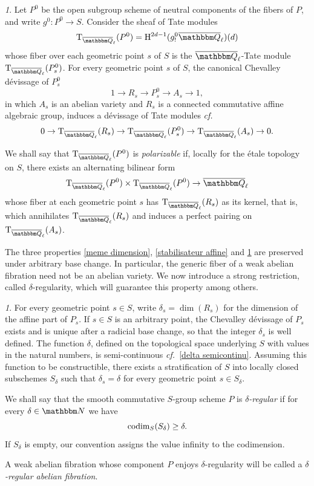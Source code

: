 \documentclass[12pt,english]{smfart}
\numberwithin{equation}{subsection}
\theoremstyle{remark}
\newtheorem{numero}[equation]{}
\newcommand\rmT{{\rm T}}
\newcommand\NN{{\mathbbm N}}
\newcommand\QQ{{\mathbbm Q}}
\newcommand\rmH{{\rm H}}
\newcommand\cf{{\it cf.\ }}
\newcommand\Ql{{\overline\QQ_\ell}}
\begin{document}
\begin{numero}\label{module de Tate polarisable}
Let $P^0$ be the open subgroup scheme of neutral components of the fibers of $P$, and write $g^0:P^0\rightarrow S$. Consider the sheaf of Tate modules
$$\rmT_\Ql(P^0)=\rmH^{2d-1}(g^0_! \Ql)(d)$$
whose fiber over each geometric point $s$ of $S$ is the $\Ql$-Tate module $\rmT_\Ql(P^0_s)$. For every geometric point $s$ of $S$, the canonical Chevalley d\'evissage of $P^0_s$
$$1\rightarrow R_s \rightarrow P^0_s \rightarrow A_s \rightarrow 1,$$
in which $A_s$ is an abelian variety and $R_s$ is a connected commutative affine algebraic group, induces a d\'evissage of Tate modules \cf \cite{SGA7}
$$0\rightarrow \rmT_\Ql(R_s)\rightarrow \rmT_\Ql(P^0_s) \rightarrow \rmT_\Ql(A_s)\rightarrow 0.$$

We shall say that $\rmT_\Ql(P^0)$ is {\em polarizable} if, locally for the \'etale topology on $S$, there exists an alternating bilinear form
$$\rmT_\Ql(P^0)\times \rmT_\Ql(P^0)\rightarrow \Ql$$
whose fiber at each geometric point $s$ has $\rmT_\Ql(R_s)$ as its kernel, that is, which annihilates $\rmT_\Ql(R_s)$ and induces a perfect pairing on $\rmT_\Ql(A_s)$.
\end{numero}

The three properties \ref{meme dimension}, \ref{stabilisateur affine} and \ref{module de Tate polarisable} are preserved under arbitrary base change. In particular, the generic fiber of a weak abelian fibration need not be an abelian variety. We now introduce a strong restriction, called $\delta$-regularity, which will guarantee this property among others.

\begin{numero}\label{delta regulier}
For every geometric point $s\in S$, write $\delta_s=\dim(R_s)$ for the dimension of the affine part of $P_s$. If $s\in S$ is an arbitrary point, the Chevalley d\'evissage of $P_s$ exists and is unique after a radicial base change, so that the integer $\delta_s$ is well defined. The function $\delta$, defined on the topological space underlying $S$ with values in the natural numbers, is semi-continuous \cf \ref{delta semicontinu}. Assuming this function to be constructible, there exists a stratification of $S$ into locally closed subschemes $S_\delta$ such that $\delta_s=\delta$ for every geometric point $s\in S_\delta$.

We shall say that the smooth commutative $S$-group scheme $P$ is {\em $\delta$-regular} if for every $\delta\in\NN$ we have
$${\rm codim}_S(S_\delta)\geq \delta.$$
If $S_\delta$ is empty, our convention assigns the value infinity to the codimension.

A weak abelian fibration whose component $P$ enjoys $\delta$-regularity will be called a {\em $\delta$-regular abelian fibration}.
\end{numero}
\end{document}
